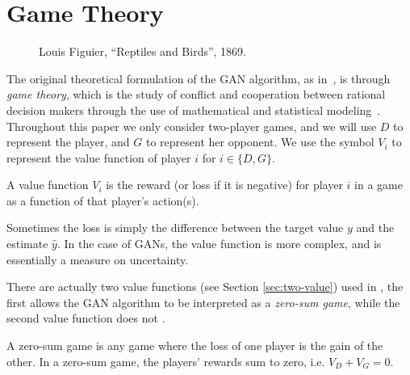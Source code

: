 \section{Game Theory}
\label{sec:game-theory}

\vspace{1cm}

\begin{figure}[h]
  \label{fig:paradise}
  \centering
  \caption{Louis Figuier, ``Reptiles and Birds'', 1869.}
\end{figure}

\vspace{1cm}

\noindent The original theoretical formulation of the GAN algorithm,
as in~\cite{ref:goodfellow-original}, is through \textit{game theory},
which is the study of conflict and cooperation between rational
decision makers through the use of mathematical and statistical
modeling~\cite{ref:myerson}.  Throughout this paper we only consider
two-player games, and we will use $D$ to represent the player, and $G$
to represent her opponent. We use the symbol $V_i$ to represent the
value function of player $i$ for $i \in \{D, G\}$.

\begin{definition}
  \label{def:value-function}
  A \textnormal{\sffamily value function} $V_i$ is the reward (or loss
  if it is negative) for player $i$ in a game as a function of that
  player's action(s).
\end{definition}

\begin{remark} Sometimes the loss is simply the difference between the
  target value $y$ and the estimate $\hat{y}$. In the case of GANs,
  the value function is more complex, and is essentially a measure on
  uncertainty.
\end{remark}

There are actually two value functions (see Section
\ref{sec:two-value}) used in \cite{ref:goodfellow-original}, the first
allows the GAN algorithm to be interpreted as a \textit{zero-sum
  game}, while the second value function does not
\cite{ref:gidel-variational-2018}.

\begin{definition}
  \label{def:zero-sum-game} A \textnormal{\sffamily zero-sum game} is
  any game where the loss of one player is the gain of the other. In a
  zero-sum game, the players' rewards sum to zero, i.e.
  $V_D + V_G = 0$.
\end{definition}

